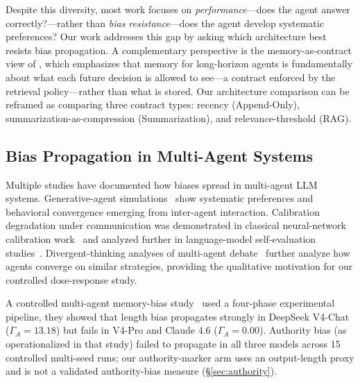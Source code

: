 \documentclass[11pt]{article}
\begin{document}
Despite this diversity, most work focuses on \emph{performance}---does the agent answer correctly?---rather than \emph{bias resistance}---does the agent develop systematic preferences? Our work addresses this gap by asking which architecture best resists bias propagation. A complementary perspective is the memory-as-contract view of \citet{cheng2026agenticsts}, which emphasizes that memory for long-horizon agents is fundamentally about what each future decision is allowed to see---a contract enforced by the retrieval policy---rather than what is stored. Our architecture comparison can be reframed as comparing three contract types: recency (Append-Only), summarization-as-compression (Summarization), and relevance-threshold (RAG).

\subsection{Bias Propagation in Multi-Agent Systems}

Multiple studies have documented how biases spread in multi-agent LLM systems. Generative-agent simulations~\cite{park2023generative} show systematic preferences and behavioral convergence emerging from inter-agent interaction. Calibration degradation under communication was demonstrated in classical neural-network calibration work~\cite{guo2017calibration} and analyzed further in language-model self-evaluation studies~\cite{kadavath2022language}. Divergent-thinking analyses of multi-agent debate~\cite{liang2023multiagent} further analyze how agents converge on similar strategies, providing the qualitative motivation for our controlled dose-response study.

A controlled multi-agent memory-bias study~\cite{bertalanic2026cost,huang2026cagecal} used a four-phase experimental pipeline, they showed that length bias propagates strongly in DeepSeek V4-Chat ($\Gamma_A = 13.18$) but fails in V4-Pro and Claude 4.6 ($\Gamma_A = 0.00$). Authority bias (as operationalized in that study) failed to propagate in all three models across 15 controlled multi-seed runs; our authority-marker arm uses an output-length proxy and is not a validated authority-bias measure (\S\ref{sec:authority}).
\end{document}
